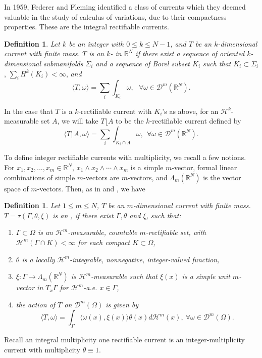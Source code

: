 \documentclass{amsart}
\numberwithin{equation}{section}
\theoremstyle{definition}
\newtheorem{definition}[theorem]{Definition}
\theoremstyle{remark}
\newcommand{\R}{\mathbb{R}}
\begin{document}
In 1959, Federer and Fleming \cite {Federer60} identified a class of currents which they deemed valuable in the study of calculus of variations, due to their compactness properties. These are the integral rectifiable currents.

\begin{definition} \textit{Let $k$ be an integer with $0 \leq k \leq N-1$, and $T$ be an {$k$-dimensional} 
current with finite mass. $T$ is an $k$- in $\mathbb{R}^N$ if there exist a sequence of oriented 
{$k$-dimensional} submanifolds $\Sigma_i$ and a sequence of Borel subset $K_i$ such that} $K_i \subset \Sigma_i $, 
$\displaystyle\sum_i \textit{H}^k(K_i) < \infty$, \textit{and}
\[ \langle T, \omega \rangle = \sum_i \int_{K_i} \omega, \ \ \  \forall \omega \in \mathcal{D}^m(\R^N) .\]
\end{definition}
In the case that $T$ is a $k$-rectifiable current with $ K_i$'s as above, for an $\mathcal{H}^k$-measurable set $A$, 
we will take {$T \lfloor A$} to be the $k$-rectifiable current defined by
\[ \big\langle T\lfloor A,\omega \big\rangle = \sum_i \int_{K_i \cap A} \omega, \ \  \forall \omega \in \mathcal{D}^m(\R^N) .\]

To define integer rectifiable currents with multiplicity, we recall a few notions. For $x_1, x_2, ..., x_m \in \mathbb{R}^N$, $x_1 \wedge x_2 \wedge \cdots \wedge x_m$ is a simple $m$-vector, formal linear combinations of simple $m$-vectors are $m$-vectors, and $\Lambda_m(\mathbb{R}^N)$ is the vector space of $m$-vectors. Then, as in \cite{Krantz} and \cite{Simon}, we have

\begin{definition}\textit{Let $1 \leq m \leq N$, $T$ be an {$m$-dimensional} current with finite mass. $T = \tau (\Gamma, \theta, \xi)$ is an , if there exist $\Gamma, \theta$ and $\xi$, such that:}
\begin{enumerate}
\item \textit{$\Gamma \subset \Omega$ is an $\mathcal{H}^m$-measurable, countable $m$-rectifiable set,
with $\mathcal{H}^m(\Gamma \cap K) < \infty$ for each compact $K \subset \Omega$,}
\item \textit{$\theta$ is a locally $\mathcal{H}^m$-integrable, nonnegative, integer-valued function,}
\item \textit{$\xi: \Gamma \to \Lambda_m(\mathbb{R}^N)$ is $\mathcal{H}^m$-measurable 
such that  $\xi(x)$ is a simple unit $m$-vector in $T_x \Gamma$ for $\mathcal{H}^m$-a.e. $x \in \Gamma$, }
\item \textit{the action of $T$ {on $\mathcal{D}^m(\Omega)$} is given by
\[ \langle T, \omega \rangle = \int_\Gamma \langle \omega(x), \xi(x) \rangle \theta(x) d\mathcal{H}^m(x), 
\ \forall\omega \in \mathcal{D}^m(\Omega).
\]}
\end{enumerate}
\end{definition}
Recall an integral multiplicity one rectifiable current is an integer-multiplicity current with multiplicity $\theta \equiv 1$.
\end{document}
